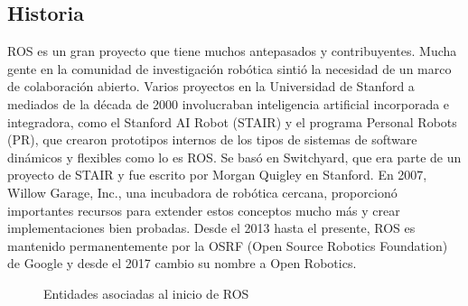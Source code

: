     \subsection{Historia}
    
        ROS es un gran proyecto que tiene muchos antepasados y contribuyentes. Mucha gente en la comunidad de investigación robótica sintió la necesidad de un marco de colaboración abierto. Varios proyectos en la Universidad de Stanford a mediados de la década de 2000 involucraban inteligencia artificial incorporada e integradora, como el Stanford AI Robot (STAIR) y el programa Personal Robots (PR), que crearon prototipos internos de los tipos de sistemas de software dinámicos y flexibles como lo es ROS. Se basó en Switchyard, que era parte de un proyecto de STAIR y fue escrito por Morgan Quigley en Stanford. En 2007, Willow Garage, Inc., una incubadora de robótica cercana, proporcionó importantes recursos para extender estos conceptos mucho más y crear implementaciones bien probadas. Desde el 2013 hasta el presente, ROS es mantenido permanentemente por la OSRF (Open Source Robotics Foundation) de Google y desde el 2017 cambio su nombre a Open Robotics.
        
        \begin{figure}[htbp]
            \centering
            \caption{Entidades asociadas al inicio de ROS} 
            \label{f:Cap3-4_entidades_inicio_ros}
        \end{figure}
        

